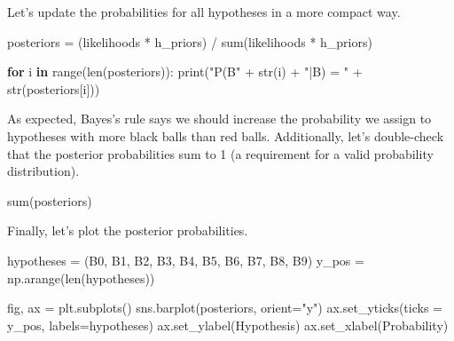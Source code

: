 \documentclass[
  letterpaper,
  DIV=11,
  numbers=noendperiod]{scrreprt}
\newenvironment{Shaded}{\begin{snugshade}}{\end{snugshade}}
\newcommand{\BuiltInTok}[1]{\textcolor[rgb]{0.00,0.23,0.31}{#1}}
\newcommand{\ControlFlowTok}[1]{\textcolor[rgb]{0.00,0.23,0.31}{\textbf{#1}}}
\newcommand{\KeywordTok}[1]{\textcolor[rgb]{0.00,0.23,0.31}{\textbf{#1}}}
\newcommand{\NormalTok}[1]{\textcolor[rgb]{0.00,0.23,0.31}{#1}}
\newcommand{\OperatorTok}[1]{\textcolor[rgb]{0.37,0.37,0.37}{#1}}
\newcommand{\StringTok}[1]{\textcolor[rgb]{0.13,0.47,0.30}{#1}}
\begin{document}
Let's update the probabilities for all hypotheses in a more compact way.

\begin{Shaded}
\begin{Highlighting}[]
\NormalTok{posteriors }\OperatorTok{=}\NormalTok{ (likelihoods }\OperatorTok{*}\NormalTok{ h\_priors) }\OperatorTok{/} \BuiltInTok{sum}\NormalTok{(likelihoods }\OperatorTok{*}\NormalTok{ h\_priors)}

\ControlFlowTok{for}\NormalTok{ i }\KeywordTok{in} \BuiltInTok{range}\NormalTok{(}\BuiltInTok{len}\NormalTok{(posteriors)):}
  \BuiltInTok{print}\NormalTok{(}\StringTok{"P(B"} \OperatorTok{+} \BuiltInTok{str}\NormalTok{(i) }\OperatorTok{+} \StringTok{"|B) = "} \OperatorTok{+} \BuiltInTok{str}\NormalTok{(posteriors[i]))}
\end{Highlighting}
\end{Shaded}

As expected, Bayes's rule says we should increase the probability we
assign to hypotheses with more black balls than red balls. Additionally,
let's double-check that the posterior probabilities sum to 1 (a
requirement for a valid probability distribution).

\begin{Shaded}
\begin{Highlighting}[]
\BuiltInTok{sum}\NormalTok{(posteriors)}
\end{Highlighting}
\end{Shaded}

Finally, let's plot the posterior probabilities.

\begin{Shaded}
\begin{Highlighting}[]
\NormalTok{hypotheses }\OperatorTok{=}\NormalTok{ (}\StringTok{\textquotesingle{}B0\textquotesingle{}}\NormalTok{, }\StringTok{\textquotesingle{}B1\textquotesingle{}}\NormalTok{, }\StringTok{\textquotesingle{}B2\textquotesingle{}}\NormalTok{, }\StringTok{\textquotesingle{}B3\textquotesingle{}}\NormalTok{, }\StringTok{\textquotesingle{}B4\textquotesingle{}}\NormalTok{,}
              \StringTok{\textquotesingle{}B5\textquotesingle{}}\NormalTok{, }\StringTok{\textquotesingle{}B6\textquotesingle{}}\NormalTok{, }\StringTok{\textquotesingle{}B7\textquotesingle{}}\NormalTok{, }\StringTok{\textquotesingle{}B8\textquotesingle{}}\NormalTok{, }\StringTok{\textquotesingle{}B9\textquotesingle{}}\NormalTok{)}
\NormalTok{y\_pos }\OperatorTok{=}\NormalTok{ np.arange(}\BuiltInTok{len}\NormalTok{(hypotheses))}

\NormalTok{fig, ax }\OperatorTok{=}\NormalTok{ plt.subplots()}
\NormalTok{sns.barplot(posteriors, orient}\OperatorTok{=}\StringTok{"y"}\NormalTok{)}
\NormalTok{ax.set\_yticks(ticks }\OperatorTok{=}\NormalTok{ y\_pos, labels}\OperatorTok{=}\NormalTok{hypotheses)}
\NormalTok{ax.set\_ylabel(}\StringTok{\textquotesingle{}Hypothesis\textquotesingle{}}\NormalTok{)}
\NormalTok{ax.set\_xlabel(}\StringTok{\textquotesingle{}Probability\textquotesingle{}}\NormalTok{)}
\end{Highlighting}
\end{Shaded}
\end{document}
